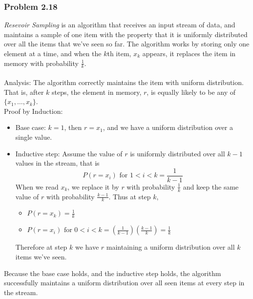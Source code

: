 \documentclass[12pt,letterpaper]{article}
\newenvironment{answer}[1]{
  \subsubsection*{Problem #1}
}{\newpage}
\begin{document}
\begin{answer}{2.18}
\emph{Resevoir Sampling} is an algorithm that receives an input stream of data, and maintains a sample of one item with the property that it is uniformly distributed over all the items that we've seen so far. The algorithm works by storing only one element at a time, and when the $k$th item, $x_k$ appears, it replaces the item in memory with probability $\frac{1}{k}$.\\\\
Analysis: The algorithm correctly maintains the item with uniform distribution. That is, after $k$ steps, the element in memory, $r$, is equally likely to be any of $\{x_1, \ldots, x_k \}$.\\
Proof by Induction:
    \begin{itemize}
        \item Base case: $k = 1$, then $r = x_1$, and we have a uniform distribution over a single value.
        \item Inductive step: Assume the value of $r$ is uniformly distributed over all $k-1$ values in the stream, that is
            $$P(r = x_i) \text{ for } 1 < i < k = \frac{1}{k-1}$$
        When we read $x_k$, we replace it by $r$ with probability $\frac{1}{k}$ and keep the same value of $r$ with probability $\frac{k-1}{k}$. Thus at step $k$,
        \begin{itemize}
            \item $P(r = x_k) = \frac{1}{k}$
            \item $P(r = x_i) \text{ for } 0 < i < k =
                \left(\frac{1}{k-1}\right)\left(\frac{k-1}{k}\right) = \frac{1}{k}$
        \end{itemize}
        Therefore at step $k$ we have $r$ maintaining a uniform distribution over all $k$ items we've seen.
    \end{itemize}
    Because the base case holds, and the inductive step holds, the algorithm successfully maintains a uniform distribution over all seen items at every step in the stream.
\end{answer}
\end{document}
